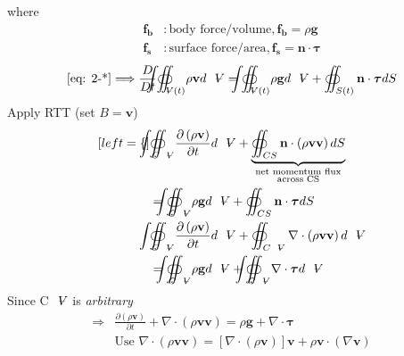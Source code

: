 \begin{itemize}
\begin{equation}
\tag{$\ast$} \label{eq: 2-*}
\end{equation}
where 
\begin{align*}
\mathbf{f_b}&\colon\text{body force/volume},\mathbf{f_b} = \rho\mathbf{g} \\
\mathbf{f_s}&\colon\text{surface force/area},\mathbf{f_s} = \mathbf{n}\cdot\boldsymbol{\tau}
\end{align*}
\[
\eqref{eq: 2-*}\Longrightarrow
\frac{D}{Dt}{\oiint \hspace{-23.5pt} \int}_{\volume (t)}\rho\mathbf{v}d\volume = {\oiint \hspace{-23.5pt} \int}_{\volume (t)}\rho\mathbf{g}d\volume + \oiint_{S(t)}\mathbf{n}\cdot\boldsymbol{\tau}dS
\]
Apply RTT (set $B=\mathbf{v}$)
\begin{subequations}
\begin{align}[left = \empheqlbrace\,]
&{\oiint \hspace{-23.5pt} \int}_{C\volume}\frac{\partial\left(\rho\mathbf{v}\right)}{\partial t} d\volume + \underbrace{\oiint_{CS}\mathbf{n}\cdot\left(\rho \mathbf{v}\mathbf{v}\right)dS}_
{
\begin{subarray}{c}
  \text{net momentum flux}\\
  \text{across CS}
\end{subarray}
}\nonumber \\
&= {\oiint \hspace{-23.5pt} \int}_{C\volume }\rho\mathbf{g}d\volume + \oiint_{CS}\mathbf{n}\cdot\boldsymbol{\tau}dS \\
&{\oiint \hspace{-23.5pt} \int}_{C\volume}\frac{\partial\left(\rho\mathbf{v}\right)}{\partial t} d\volume + \oiint_{C\volume}\nabla\cdot\left(\rho \mathbf{v}\mathbf{v}\right)d\volume \nonumber\\ 
&= {\oiint \hspace{-23.5pt} \int}_{C\volume }\rho\mathbf{g}d\volume + {\oiint \hspace{-23.5pt} \int}_{C\volume }\nabla\cdot\boldsymbol{\tau}d\volume
\end{align}
\end{subequations}
Since C$\volume$ is \emph{arbitrary}
\begin{subequations}
\begin{align}
\Longrightarrow &\frac{\partial\left(\rho\mathbf{v}\right)}{\partial t} + \nabla\cdot\left(\rho \mathbf{v}\mathbf{v}\right) = \rho\mathbf{g} + \nabla\cdot\boldsymbol{\tau} \\
&\text{Use }\nabla\cdot\left(\rho\mathbf{v}\mathbf{v}\right) = \left[\nabla\cdot\left(\rho\mathbf{v}\right)\right]\mathbf{v} + \rho\mathbf{v}\cdot\left(\nabla\mathbf{v}\right) \nonumber\\

\end{align}
\end{subequations}
\end{itemize}
